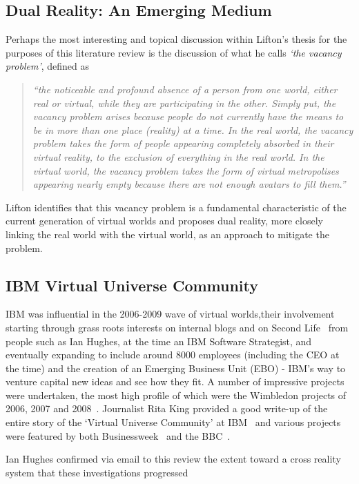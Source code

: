 \subsection{Dual Reality: An Emerging Medium}
\label{subsec:dual_reality_:_an_emerging_medium}
Perhaps the most interesting and topical discussion within Lifton's thesis for the purposes of this literature review is the discussion of what he calls \textit{`the vacancy problem'}, defined as
\begin{quote}
\textit{``the noticeable and profound absence of a person from one world, either real or virtual, while they are participating in the other. Simply put, the vacancy problem arises because people do not currently have the means to be in more than one place (reality) at a time. In the real world, the vacancy problem takes the form of people appearing completely absorbed in their virtual reality, to the exclusion of everything in the real world. In the virtual world, the vacancy problem takes the form of virtual metropolises appearing nearly empty because there are not enough avatars to fill them.''}
\end{quote}
Lifton identifies that this vacancy problem is a fundamental characteristic of the current generation of virtual worlds and proposes dual reality, more closely linking the real world with the virtual world, as an approach to mitigate the problem.

\subsection{IBM Virtual Universe Community}
IBM was influential in the 2006-2009 wave of virtual worlds,their involvement starting through grass roots interests on internal blogs and on Second Life~\cite{Hughes2006, Hughes2006a,Hughes2006b} from people such as Ian Hughes, at the time an IBM Software Strategist, and eventually expanding to include around 8000 employees (including the CEO at the time) and the creation of an Emerging Business Unit (EBO) - IBM's way to venture capital new ideas and see how they fit. A number of impressive projects were undertaken, the most high profile of which were the Wimbledon projects of 2006, 2007 and 2008~\cite{Hughes2006c, Hughes2009}. Journalist Rita King provided a good write-up of the entire story of the `Virtual Universe Community' at IBM~\cite{King2008} and various projects were featured by both Businessweek~\cite{Life2006} and the BBC~\cite{Mason2007}.

Ian Hughes confirmed via email to this review the extent toward a cross reality system that these investigations progressed

